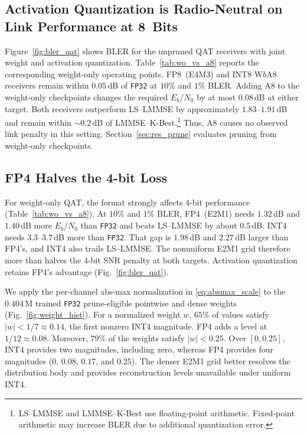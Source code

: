\subsection{Activation Quantization is Radio-Neutral on Link Performance at 8~Bits}
\label{sec:res_a8}
Figure~\ref{fig:bler_qat} shows \gls{BLER} for the unpruned QAT
receivers with joint weight and activation quantization.
Table~\ref{tab:wo_vs_a8} reports the corresponding weight-only
operating points. FP8~(E4M3) and INT8 W$b$A8 receivers remain within
$0.05$\,dB of \texttt{FP32} at $10\%$ and $1\%$ \gls{BLER}. Adding A8
to the weight-only checkpoints changes the required $E_b/N_0$ by at
most $0.08$\,dB at either target. Both receivers outperform LS--\gls{LMMSE}
by approximately $1.83$--$1.91$\,dB and remain within
$\sim0.2$\,dB of \gls{LMMSE}--K-Best.\footnote{LS--\gls{LMMSE} and \gls{LMMSE}--K-Best use
floating-point arithmetic. Fixed-point arithmetic may increase
\gls{BLER} due to additional quantization error.} Thus, A8 causes no observed link
penalty in this setting. Section~\ref{sec:res_prune} evaluates pruning
from weight-only checkpoints.

\vspace{-2mm}

\subsection{FP4 Halves the 4-bit Loss}
\label{sec:res_fp4}
For weight-only QAT, the format strongly affects 4-bit performance
(Table~\ref{tab:wo_vs_a8}). At $10\%$ and $1\%$ \gls{BLER}, FP4~(E2M1)
needs $1.32$\,dB and $1.40$\,dB more $E_b/N_0$ than \texttt{FP32}
and beats LS--\gls{LMMSE} by about $0.5$\,dB. INT4 needs $3.3$--$3.7$\,dB
more than \texttt{FP32}. That gap is $1.98$\,dB and $2.27$\,dB larger
than FP4's, and INT4 also trails LS--\gls{LMMSE}. The nonuniform
E2M1 grid therefore more than halves the 4-bit SNR penalty at both
targets. Activation quantization retains FP4's advantage (Fig.~\ref{fig:bler_qat}).

We apply the per-channel abs-max normalization in
\eqref{eq:absmax_scale} to the $0.404$\,M trained \texttt{FP32}
prune-eligible pointwise and dense weights
(Fig.~\ref{fig:weight_hist}). For a normalized weight $w$, $65\%$ of
values satisfy $|w|<1/7\approx0.14$, the first nonzero INT4 magnitude.
FP4 adds a level at $1/12\approx0.08$. Moreover, $79\%$ of the weights
satisfy $|w|<0.25$. Over $[0,0.25]$, INT4 provides two magnitudes,
including zero, whereas FP4 provides four magnitudes
($0$, $0.08$, $0.17$, and $0.25$). The denser E2M1 grid better
resolves the distribution body and provides reconstruction levels
unavailable under uniform INT4.

